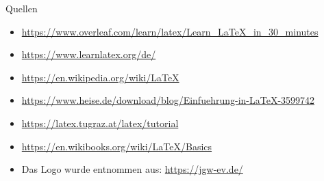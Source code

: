     \begin{frame}{Quellen}

        \scriptsize

        \begin{itemize}
            \item \url{https://www.overleaf.com/learn/latex/Learn_LaTeX_in_30_minutes}
            \item \url{https://www.learnlatex.org/de/}
            \item \url{https://en.wikipedia.org/wiki/LaTeX}
            \item \url{https://www.heise.de/download/blog/Einfuehrung-in-LaTeX-3599742}
            \item \url{https://latex.tugraz.at/latex/tutorial}
            \item \url{https://en.wikibooks.org/wiki/LaTeX/Basics}
            \item Das Logo wurde entnommen aus: \url{https://jgw-ev.de/}
        \end{itemize}
    \end{frame}

